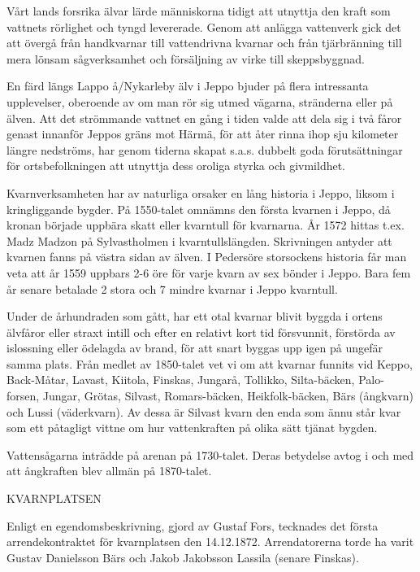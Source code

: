 
Vårt lands forsrika älvar lärde människorna tidigt att utnyttja den kraft som vattnets rörlighet och tyngd levererade. Genom att anlägga vattenverk gick det att övergå från handkvarnar till vattendrivna kvarnar och från tjärbränning till mera lönsam sågverksamhet och försäljning av virke till skeppsbyggnad.

En färd längs Lappo å/Nykarleby älv i Jeppo bjuder på flera intressanta upplevelser, oberoende av om man rör sig utmed vägarna, stränderna eller på älven. Att det strömmande vattnet en gång i tiden valde att dela sig i två fåror genast innanför Jeppos gräns mot Härmä, för att åter rinna ihop sju kilometer längre nedströms, har genom tiderna skapat s.a.s. dubbelt goda förutsättningar för ortsbefolkningen att utnyttja dess oroliga styrka och givmildhet.

Kvarnverksamheten har av naturliga orsaker en lång historia i Jeppo, liksom i kringliggande bygder. På 1550-talet omnämns den första kvarnen i Jeppo, då kronan började uppbära skatt eller kvarntull för kvarnarna. År 1572 hittas t.ex. Madz Madzon på Sylvastholmen i kvarntullslängden. Skrivningen antyder att kvarnen fanns på västra sidan av älven. I Pedersöre storsockens historia får man veta att år 1559 uppbars 2-6 öre för varje kvarn av sex bönder i Jeppo. Bara fem år senare betalade 2 stora och 7 mindre kvarnar i Jeppo kvarntull.

Under de århundraden som gått, har ett otal kvarnar blivit byggda i ortens  älvfåror eller straxt intill och efter en relativt kort tid försvunnit, förstörda av islossning eller ödelagda av brand, för att snart byggas upp igen på ungefär samma plats. Från medlet av 1850-talet vet vi om att kvarnar funnits vid Keppo, Back-Måtar, Lavast, Kiitola, Finskas, Jungarå, Tollikko, Silta-bäcken, Palo-forsen, Jungar, Grötas, Silvast, Romars-bäcken, Heikfolk-bäcken, Bärs (ångkvarn) och Lussi (väderkvarn). Av dessa är Silvast kvarn den enda som ännu står kvar som ett påtagligt vittne om hur vattenkraften på olika sätt tjänat bygden.

Vattensågarna inträdde på arenan på 1730-talet. Deras betydelse avtog i och med att ångkraften blev allmän på 1870-talet.


KVARNPLATSEN

Enligt en egendomsbeskrivning, gjord av Gustaf Fors, tecknades det första arrendekontraktet för kvarnplatsen den 14.12.1872. Arrendatorerna torde ha varit Gustav Danielsson Bärs och Jakob Jakobsson Lassila (senare Finskas).

